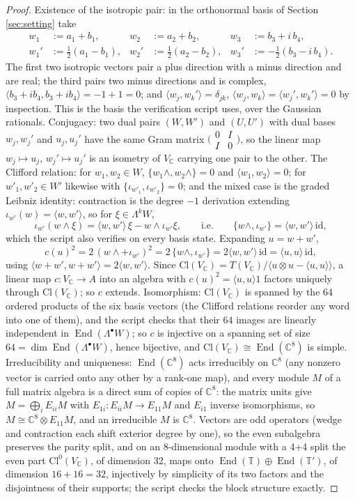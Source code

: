 \documentclass[11pt]{article}
\theoremstyle{definition}
\newcommand{\Cl}{\mathrm{Cl}}
\newcommand{\C}{\mathbb{C}}
\newcommand{\T}{\mathbb{T}}
\newcommand{\End}{\operatorname{End}}
\newcommand{\id}{\mathrm{id}}
\newcommand{\ip}[2]{\langle #1, #2\rangle}
\begin{document}
\begin{proof}
Existence of the isotropic pair: in the orthonormal basis of Section \ref{sec:setting} take
\begin{align*}
w_1 &:= a_1 + b_1, & w_2 &:= a_2 + b_2, & w_3 &:= b_3 + i\,b_4,\\
w_1' &:= \tfrac12(a_1 - b_1), & w_2' &:= \tfrac12(a_2 - b_2), & w_3' &:= -\tfrac12(b_3 - i\,b_4).
\end{align*}
The first two isotropic vectors pair a plus direction with a minus direction and are real; the third pairs two minus directions and is complex, $\ip{b_3 + ib_4}{b_3 + ib_4} = -1 + 1 = 0$; and $\ip{w_j}{w_k'} = \delta_{jk}$, $\ip{w_j}{w_k} = \ip{w_j'}{w_k'} = 0$ by inspection. This is the basis the verification script uses, over the Gaussian rationals. Conjugacy: two dual pairs $(W, W')$ and $(U, U')$ with dual bases $w_j, w_j'$ and $u_j, u_j'$ have the same Gram matrix $\bigl(\begin{smallmatrix} 0 & I \\ I & 0\end{smallmatrix}\bigr)$, so the linear map $w_j \mapsto u_j$, $w_j' \mapsto u_j'$ is an isometry of $V_\C$ carrying one pair to the other. The Clifford relation: for $w_1, w_2 \in W$, $\{w_1\wedge, w_2\wedge\} = 0$ and $\ip{w_1}{w_2} = 0$; for $w'_1, w'_2 \in W'$ likewise with $\{\iota_{w'_1}, \iota_{w'_2}\} = 0$; and the mixed case is the graded Leibniz identity: contraction is the degree $-1$ derivation extending $\iota_{w'}(w) = \ip{w}{w'}$, so for $\xi \in \Lambda^k W$,
\[
\iota_{w'}(w\wedge\xi) = \ip{w}{w'}\,\xi - w\wedge\iota_{w'}\xi, \qquad\text{i.e.}\qquad \{w\wedge, \iota_{w'}\} = \ip{w}{w'}\,\id ,
\]
which the script also verifies on every basis state. Expanding $u = w + w'$,
\[
c(u)^2 = 2\,(w\wedge + \iota_{w'})^2 = 2\,\{w\wedge, \iota_{w'}\} = 2\ip{w}{w'}\,\id = \ip{u}{u}\,\id ,
\]
using $\ip{w+w'}{w+w'} = 2\ip{w}{w'}$. Since $\Cl(V_\C) = T(V_\C)/\langle u\otimes u - \ip{u}{u}\rangle$, a linear map $c: V_\C \to A$ into an algebra with $c(u)^2 = \ip{u}{u}1$ factors uniquely through $\Cl(V_\C)$; so $c$ extends. Isomorphism: $\Cl(V_\C)$ is spanned by the $64$ ordered products of the six basis vectors (the Clifford relations reorder any word into one of them), and the script checks that their $64$ images are linearly independent in $\End(\Lambda^\bullet W)$; so $c$ is injective on a spanning set of size $64 = \dim \End(\Lambda^\bullet W)$, hence bijective, and $\Cl(V_\C) \cong \End(\C^8)$ is simple. Irreducibility and uniqueness: $\End(\C^8)$ acts irreducibly on $\C^8$ (any nonzero vector is carried onto any other by a rank-one map), and every module $M$ of a full matrix algebra is a direct sum of copies of $\C^8$: the matrix units give $M = \bigoplus_i E_{ii}M$ with $E_{1i}: E_{ii}M \to E_{11}M$ and $E_{i1}$ inverse isomorphisms, so $M \cong \C^8 \otimes E_{11}M$, and an irreducible $M$ is $\C^8$. Vectors are odd operators (wedge and contraction each shift exterior degree by one), so the even subalgebra preserves the parity split, and on an 8-dimensional module with a 4+4 split the even part $\Cl^0(V_\C)$, of dimension 32, maps onto $\End(\T)\oplus\End(\T')$, of dimension $16 + 16 = 32$, injectively by simplicity of its two factors and the disjointness of their supports; the script checks the block structure exactly.

\end{proof}
\end{document}
